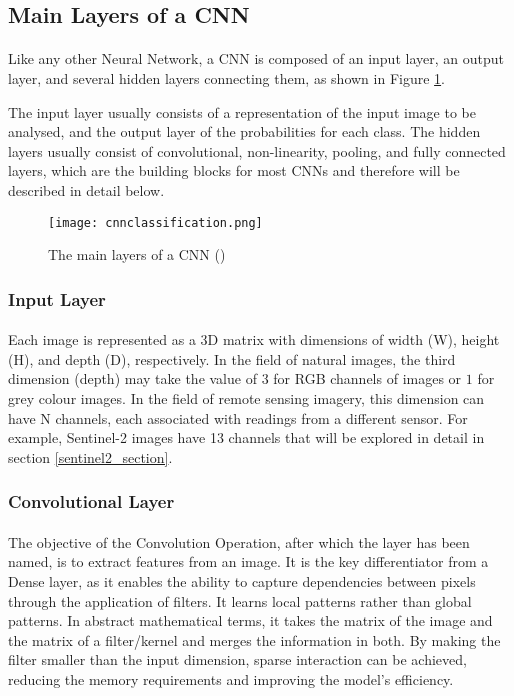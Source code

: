 \subsection{Main Layers of a \gls{CNN}} \label{cnn_layers}
\paragraph{}
Like any other Neural Network, a \gls{CNN} is composed of an input layer, an output layer, and several hidden layers connecting them, as shown in Figure \ref{fig_cnn_layers}.

The input layer usually consists of a representation of the input image to be analysed, and the output layer of the probabilities for each class.
The hidden layers usually consist of convolutional, non-linearity, pooling, and fully connected layers, which are the building blocks for most \gls{CNN}s and therefore will be described in detail below.

    \begin{figure}[hbt!]
        \centering
        \texttt{[image: cnnclassification.png]}
        \caption{The main layers of a \gls{CNN} (\cite{10.6109/JICCE.2018.16.3.173})}
        \label{fig_cnn_layers}
    \end{figure}

\subsubsection{Input Layer}
\paragraph{}
Each image is represented as a 3D matrix with dimensions of width (W), height (H), and depth (D), respectively. In the field of natural images, the third dimension (depth) may take the value of $3$ for \gls{RGB} channels of images or $1$ for grey colour images. In the field of remote sensing imagery, this dimension can have N channels, each associated with readings from a different sensor. For example, Sentinel-2 images have 13 channels that will be explored in detail in section \ref{sentinel2_section}. 

\subsubsection{Convolutional Layer}
\paragraph{}
The objective of the Convolution Operation, after which the layer has been named, is to extract features from an image. It is the key differentiator from a Dense layer, as it enables the ability to capture dependencies between pixels through the application of filters. It learns local patterns rather than global patterns.
In abstract mathematical terms, it takes the matrix of the image and the matrix of a filter/kernel and merges the information in both. By making the filter smaller than the input dimension, sparse interaction can be achieved, reducing the memory requirements and improving the model's efficiency.

